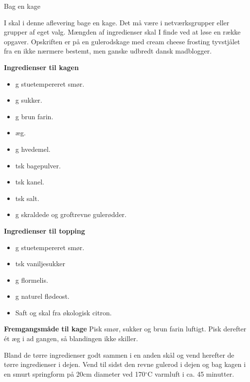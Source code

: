\begin{center}
	\LARGE
	Bag en kage
\end{center}

I skal i denne aflevering bage en kage. Det må være i netværksgrupper eller grupper af eget valg. Mængden af ingredienser skal I finde ved at løse en række opgaver. Opskriften er på en gulerodskage med cream cheese frosting tyvstjålet fra en ikke nærmere bestemt, men ganske udbredt dansk madblogger.

\textbf{Ingredienser til kagen}
\begin{itemize}
	\item[$\cdot$] \underline{\phantom{150}} g stuetempereret smør.
	\item[$\cdot$] \underline{\phantom{100}} g sukker.
	\item[$\cdot$] \underline{\phantom{100}} g brun farin.
	\item[$\cdot$] \underline{\phantom{4}} æg.
	\item[$\cdot$] \underline{\phantom{200}} g hvedemel.
	\item[$\cdot$] \underline{\phantom{2}} tsk bagepulver.
	\item[$\cdot$] \underline{\phantom{1}} tsk kanel.
	\item[$\cdot$] \underline{\phantom{0.5}} tsk salt.
	\item[$\cdot$] \underline{\phantom{275}} g skraldede og groftrevne gulerødder.
\end{itemize}

\textbf{Ingredienser til topping}
\begin{itemize}
	\item[$\cdot$] \underline{\phantom{125}} g stuetempereret smør.
	\item[$\cdot$] \underline{\phantom{1}} tsk vaniljesukker 
	\item[$\cdot$] \underline{\phantom{125}} g flormelis.
	\item[$\cdot$] \underline{\phantom{125}} g naturel flødeost.
	\item[$\cdot$] Saft og skal fra \underline{\phantom{1}} økologisk citron.
\end{itemize}

\textbf{Fremgangsmåde til kage}
Pisk smør, sukker og brun farin luftigt. Pisk derefter ét æg i ad gangen, så blandingen ikke skiller. 

Bland de tørre ingredienser godt sammen i en anden skål og vend herefter de tørre ingredienser i dejen. Vend til sidst den revne gulerod i dejen og bag kagen i en smurt springform på 20cm diameter ved 170$^\circ$C varmluft i ca. 45 minutter. 

